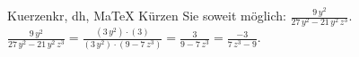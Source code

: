 \begin{MAufgabe}{Kuerzen}{kr, dh, MaTeX}
K\"urzen Sie soweit m\"oglich: $\frac{9\, y^2}{27\, y^2 - 21\, y^2\, z^3}$.\\ 
\ifLsg\MLoesung
\quad $\frac{9\, y^2}{27\, y^2 - 21\, y^2\, z^3}=\frac{(3\, y^2)\cdot(3)}{(3\, y^2)\cdot(9 - 7\, z^3)}=\frac{3}{9 - 7\, z^3}=\frac{-3}{7\, z^3 - 9}$.\else\relax\fi
 \end{MAufgabe}